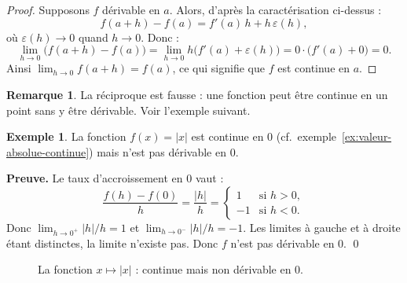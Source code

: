 \documentclass[12pt,a4paper,openany]{book}
\theoremstyle{definition}
\newtheorem{remarque}{Remarque}[chapter]
\newtheorem{exemple}{Exemple}[chapter]
\begin{document}
\begin{proof}
Supposons $f$ dérivable en $a$. Alors, d'après la caractérisation ci-dessus :
\[
  f(a + h) - f(a) = f'(a)\,h + h\,\varepsilon(h),
\]
où $\varepsilon(h) \to 0$ quand $h \to 0$. Donc :
\[
  \lim_{h \to 0} \bigl(f(a+h) - f(a)\bigr) = \lim_{h \to 0} h\bigl(f'(a) + \varepsilon(h)\bigr) = 0 \cdot \bigl(f'(a) + 0\bigr) = 0.
\]
Ainsi $\lim_{h \to 0} f(a+h) = f(a)$, ce qui signifie que $f$ est continue en $a$.
\end{proof}

\begin{remarque}\label{rem:reciproque-fausse}
La réciproque est fausse : une fonction peut être continue en un point sans y être dérivable. Voir l'exemple suivant.
\end{remarque}

\begin{exemple}\label{ex:valeur-absolue-non-derivable}
La fonction $f(x) = |x|$ est continue en $0$ (cf.\ exemple~\ref{ex:valeur-absolue-continue}) mais n'est pas dérivable en $0$.

\medskip
\textbf{Preuve.} Le taux d'accroissement en $0$ vaut :
\[
  \frac{f(h) - f(0)}{h} = \frac{|h|}{h} =
  \begin{cases}
    1 & \text{si } h > 0, \\
    -1 & \text{si } h < 0.
  \end{cases}
\]
Donc $\lim_{h \to 0^+} |h|/h = 1$ et $\lim_{h \to 0^-} |h|/h = -1$. Les limites à gauche et à droite étant distinctes, la limite n'existe pas. Donc $f$ n'est pas dérivable en $0$. \qed
\end{exemple}

\begin{figure}[ht]
\centering
{}
\caption{La fonction $x \mapsto |x|$ : continue mais non dérivable en $0$.}
\label{fig:valeur-absolue}
\end{figure}
\end{document}
